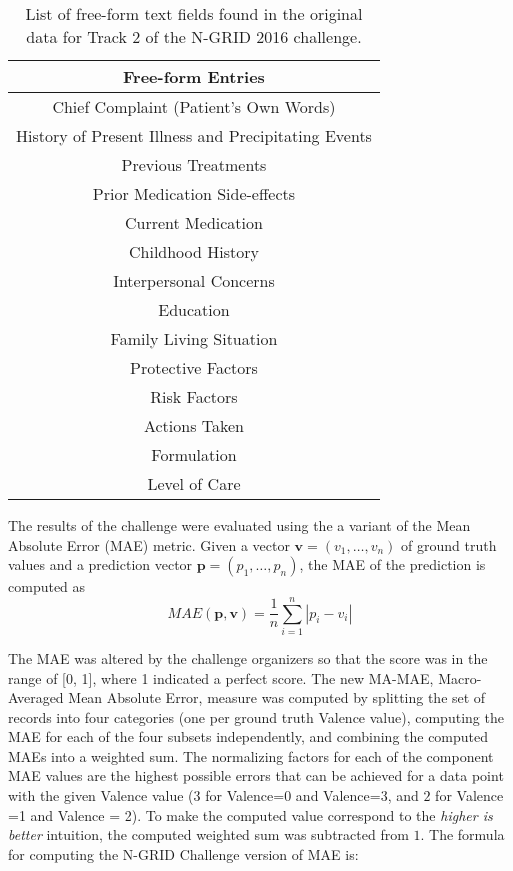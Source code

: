   \begin{table}[]
    \centering
    \begin{tabular}{|c|}  
    \hline
    \textsf{Free-form Entries} \\
    \hline
    \textsf{Chief Complaint (Patient's Own Words)}  \\
    \textsf{History of Present Illness and Precipitating Events}  \\
    \textsf{Previous Treatments}  \\
    \textsf{Prior Medication Side-effects} \\
    \textsf{Current Medication} \\
    \textsf{Childhood History}  \\ %
    \textsf{Interpersonal Concerns} \\ %
    \textsf{Education}  \\
    \textsf{Family Living Situation}  \\
    \textsf{Protective Factors}  \\
    \textsf{Risk Factors}  \\
    \textsf{Actions Taken}  \\
    \textsf{Formulation}  \\
    \textsf{Level of Care} \\
    \hline
    \end{tabular}
    \caption{List of free-form text fields found in the original data for Track 2 of the N-GRID 2016 challenge.}
    \label{tab:textdata}
\end{table}


The results of the challenge were evaluated using the a variant of the \textsf{Mean Absolute Error (MAE)} metric.  Given a vector $\mathbf{v} = (v_1,\ldots,v_n)$ of ground truth values and a prediction
vector $\mathbf{p} = (p_1,\ldots, p_n)$, the \textsf{MAE} of the prediction is computed as 
$$ MAE(\mathbf{p},\mathbf{v}) = \frac{1}{n}\sum_{i=1}^{n}| p_i - v_i|$$

The \textsf{MAE} was altered by the challenge organizers so that the
score was in the range of [0, 1], where 1 indicated a perfect score. The new \textsf{MA-MAE}, \textsf{Macro-Averaged Mean Absolute Error}, measure was computed
by splitting the set of records into four categories (one per ground truth \textsf{Valence} value), computing the \textsf{MAE} for each of the four subsets independently, and combining
the computed \textsf{MAE}s into a weighted sum. The normalizing factors
for each of the component \textsf{MAE} values are the highest possible errors that
can be achieved for a data point with the given \textsf{Valence} value
($3$ for \textsf{Valence=0} and \textsf{Valence=3}, and $2$ for
\textsf{Valence =1} and \textsf{Valence = 2}).
To make the computed value correspond to the
\textit{higher is better} intuition, the computed weighted sum was subtracted from $1$.
The formula for computing the N-GRID Challenge version of \textsf{MAE} is:


